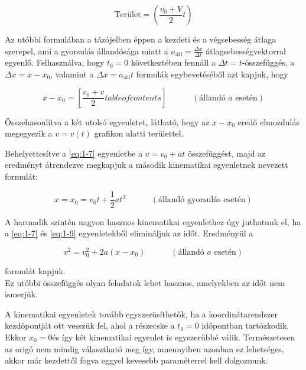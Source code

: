 \documentclass[../fizika.tex]{subfiles}
\begin{document}
                \begin{equation*}
                    \text{Terület} = \left(\frac{v_0+V}{2}t\right)
                \end{equation*}

                \noindent Az utóbbi formulában a tázójelben éppen a kezdeti és a végsebesség átlaga szerepel, ami a gyorsulás állandósága miatt a $a_{\text{átl}} = \frac{\Delta x}{\Delta t}$ átlagsebességvektorral egyenlő. Felhasználva, hogy $t_0 = 0$ következtében fennáll a $\Delta t = t$-összefüggés, a $\Delta x = x-x_0$, valamint a $\Delta x = a_{\text{átl}}t$ formulák egybevetéséből azt kapjuk, hogy 

                \begin{equation*} \tag{1-8} \label{eq:1-8}
                    x-x_0= \left[\frac{v_0+v}{2}tableofcontents\right] \;\;\;\;\;\;\;\;\;\;\; (\text{állandó }a\text{ esetén})
                \end{equation*}

                \noindent Összehasonlítva a két utolsó egyenletet, látható, hogy az $x-x_0$ eredő elmozdulás megegyezik a $v= v(t)$ grafikon alatti területtel. 

                Behelyettesítve a \eqref{eq:1-7} egyenletbe a $v = v_0 + at$ összefüggést, majd az eredményt átrendezve megkapjuk a második kinematikai egyenletnek nevezett formulát:

                \begin{equation*} \tag{1-9} \label{eq:1-9}
                    \boxed{x=x_0=v_0t+\frac{1}{2}at^2 \;\;\;\;\;\;\;\;\;\;\; (\text{állandó gyorsulás esetén})} 
                \end{equation*}

                A harmadik szintén nagyon hasznos kinematikai egyenlethez úgy juthatunk el, ha a \eqref{eq:1-7} és \eqref{eq:1-9} egyenletekből elimináljuk az időt. Eredményül a 

                \begin{equation*} \tag{1-10} \label{eq:1-10}
                    \boxed{v^2=v_0^2+2a(x-x_0) \;\;\;\;\;\;\;\;\;\;\; (\text{állandó }a\text{ esetén})}
                \end{equation*}

                \noindent formulát kapjuk. \\ Ez utóbbi összefüggés olyan feladatok lehet hasznos, amelyekben az időt nem ismerjük. 

                A kinematikai egyenletek tovább egyszerüsíthetők, ha a koordinátarendszer kezdőpontját ott vesszük fel, ahol a részecske a $t_0 = 0$ időpontban tartózkodik. Ekkor $x_0 = 0$és így két kinematikai egyenlet is egyszerűbbé válik. Természetesen az origó nem mindig választható meg így, amennyiben azonban ez lehetséges, akkor már kezdettől fogva eggyel kevesebb paraméterrel kell dolgoznunk.
\end{document}
